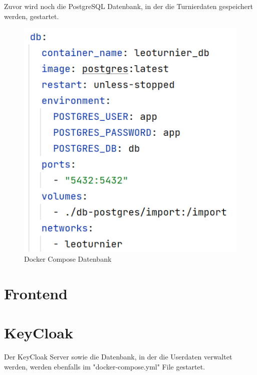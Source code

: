 Zuvor wird noch die PostgreSQL Datenbank, in der die Turnierdaten gespeichert werden, gestartet.

\begin{figure}[H]
    \includegraphics[scale=0.4]{pics/docker/docker-compose_db.png}
    \caption{Docker Compose Datenbank}
\end{figure}

\section{Frontend}

\section{KeyCloak}

Der KeyCloak Server sowie die Datenbank, in der die Userdaten verwaltet werden, werden ebenfalls im "docker-compose.yml" File gestartet.

